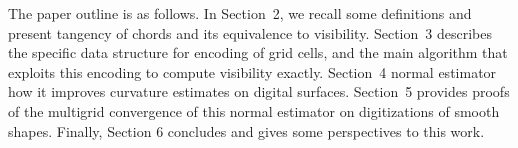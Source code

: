      The paper outline is
    as follows. In Section~2, we recall some definitions and present
    tangency of chords and its equivalence to visibility. Section~3
    describes the specific data structure for encoding  of grid
    cells, and the main algorithm that exploits this encoding to
    compute visibility exactly. Section~4  normal estimator how it improves curvature estimates on digital
    surfaces. Section~5 provides proofs of the multigrid convergence
    of this normal estimator on digitizations of smooth
    shapes. Finally, Section 6 concludes and gives some perspectives
    to this work.

